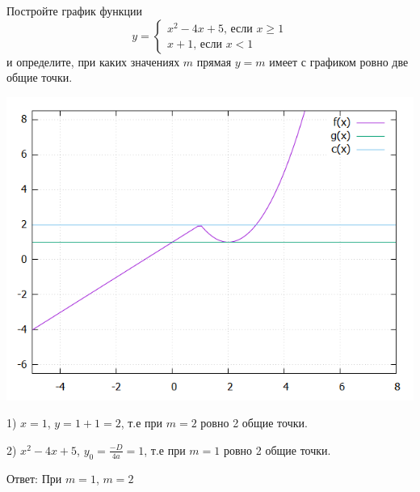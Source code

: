 \documentclass{article}
\begin{document}
Постройте график функции
\begin{equation*}
y = 
 \begin{cases}
   x^2-4x+5 \text{, если } x \geq 1 \\
   x+1 \text{, если } x<1
 \end{cases}
\end{equation*}
и определите, при каких значениях $m$ прямая $y = m$ имеет с графиком ровно две общие точки.

\includegraphics [scale=0.5]{plot.png}

1) $x=1$, $y=1+1=2$, т.е при $m=2$ ровно 2 общие точки.

2) $x^2-4x+5$,
$y_0 = \frac{-D}{4a}=1$, т.е при $m=1$ ровно 2 общие точки.

Ответ: При $m=1$, $m=2$
\end{document}
